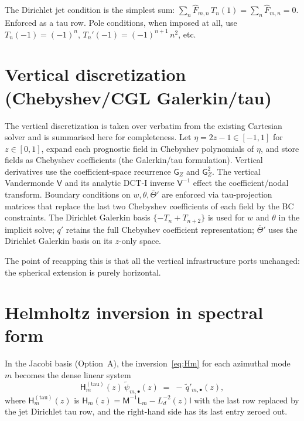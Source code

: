 \documentclass[11pt]{article}
\newcommand{\Ld}{L_d}
\begin{document}
The Dirichlet jet condition is the simplest sum:
$\sum_{n} \widehat{F}_{m,n}\,T_{n}(1) = \sum_{n} \widehat{F}_{m,n}
= 0$.  Enforced as a tau row.  Pole conditions, when imposed at all,
use $T_{n}(-1) = (-1)^{n}$, $T_{n}'(-1) = (-1)^{n+1}\,n^{2}$, etc.

\section{Vertical discretization (Chebyshev/CGL Galerkin/tau)}

The vertical discretization is taken over verbatim from the existing
Cartesian solver and is summarised here for completeness.  Let
$\eta = 2z - 1 \in [-1, 1]$ for $z \in [0, 1]$, expand each prognostic
field in Chebyshev polynomials of $\eta$, and store fields as
Chebyshev coefficients (the Galerkin/tau formulation).  Vertical
derivatives use the coefficient-space recurrence $\mathsf{G}_{Z}$ and
$\mathsf{G}_{Z}^{2}$.  The vertical Vandermonde $\mathsf{V}$ and its
analytic DCT-I inverse $\mathsf{V}^{-1}$ effect the
coefficient/nodal transform.  Boundary conditions on $w, \theta,
\overline{\Theta}'$ are enforced via tau-projection matrices that
replace the last two Chebyshev coefficients of each field by the BC
constraints.  The Dirichlet Galerkin basis $\{-T_{n} + T_{n+2}\}$ is
used for $w$ and $\theta$ in the implicit solve; $q'$ retains the
full Chebyshev coefficient representation; $\overline{\Theta}'$ uses
the Dirichlet Galerkin basis on its $z$-only space.

The point of recapping this is that all the vertical infrastructure
ports unchanged: the spherical extension is purely horizontal.

\section{Helmholtz inversion in spectral form}
\label{sec:helmholtz}

In the Jacobi basis (Option~A), the inversion~\eqref{eq:Hm} for each
azimuthal mode $m$ becomes the dense linear system
\begin{equation}
  \boxed{\;\;
  \mathsf{H}_{m}^{(\mathrm{tau})}(z)\,
  \widetilde{\psi}_{m,\bullet}(z)
  \;=\; -\,\widetilde{q}'_{m,\bullet}(z),
  \;\;}
  \label{eq:Hm-system}
\end{equation}
where $\mathsf{H}_{m}^{(\mathrm{tau})}(z)$ is $\mathsf{H}_{m}(z) =
\mathsf{M}^{-1}\mathsf{L}_{m} - \Ld^{-2}(z)\mathsf{I}$ with the last
row replaced by the jet Dirichlet tau row, and the right-hand side has
its last entry zeroed out.
\end{document}
